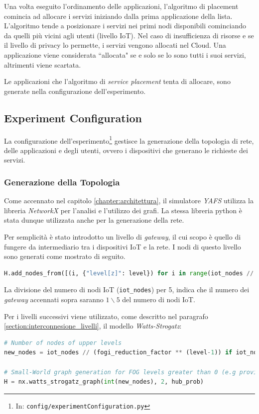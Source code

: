 Una volta eseguito l'ordinamento delle applicazioni, l'algoritmo di placement comincia ad allocare i servizi iniziando dalla prima applicazione della lista. L'algoritmo tende a posizionare i servizi nei primi nodi disponibili cominciando da quelli più vicini agli utenti (livello IoT). Nel caso di insufficienza di risorse e se il livello di privacy lo permette, i servizi vengono allocati nel Cloud. Una applicazione viene considerata ``allocata" se e solo se lo sono tutti i suoi servizi, altrimenti viene scartata.

Le applicazioni che l'algoritmo di \textit{service placement} tenta di allocare, sono generate nella configurazione dell'esperimento.

\subsection{Experiment Configuration}

La configurazione dell'esperimento\footnote{In: \texttt{config/experimentConfiguration.py}} gestisce la generazione della topologia di rete, delle applicazioni e degli utenti, ovvero i dispositivi che generano le richieste dei servizi.

\subsubsection{Generazione della Topologia}

Come accennato nel capitolo \ref{chapter:architettura}, il simulatore \textit{YAFS} utilizza la libreria \textit{NetworkX} per l'analisi e l'utilizzo dei grafi. La stessa libreria python è stata dunque utilizzata anche per la generazione della rete.

Per semplicità è stato introdotto un livello di \textit{gateway}, il cui scopo è quello di fungere da intermediario tra i dispositivi IoT e la rete. I nodi di questo livello sono generati come mostrato di seguito.

\begin{lstlisting}[language=python]
H.add_nodes_from([(i, {"level[z]": level}) for i in range(iot_nodes // 5)])
\end{lstlisting}

La divisione del numero di nodi IoT (\texttt{iot\_nodes}) per 5, indica che il numero dei \textit{gateway} accennati sopra saranno $1\backslash 5$ del numero di nodi IoT.

Per i livelli successivi viene utilizzato, come descritto nel paragrafo \ref{section:interconnesione_livelli}, il modello \textit{Watts-Strogatz}:
\begin{lstlisting}[language=python]
# Number of nodes of upper levels
new_nodes = iot_nodes // (fogi_reduction_factor ** (level-1)) if iot_nodes // (fogi_reduction_factor**(level-1)) >= 2 else 2
                
# Small-World graph generation for FOG levels greater than 0 (e.g provincial fog nodes)
H = nx.watts_strogatz_graph(int(new_nodes), 2, hub_prob)
\end{lstlisting}


